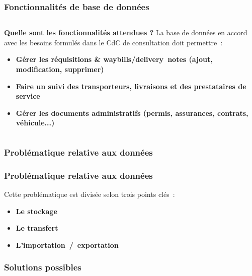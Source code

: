 \begin{frame}
\frametitle{Fonctionnalités de base de données}
\begin{columns}[c]
\begin{column}{12cm}
\begin{block}{\textbf{Quelle sont les fonctionnalités attendues ?}}
La base de données en accord avec les besoins formulés dans le CdC de consultation doit permettre~:
\begin{itemize}
\item<2-> \textbf{Gérer les réquisitions \& waybills/delivery~notes (ajout, modification, supprimer)}
\item<3-> \textbf{Faire un suivi des transporteurs, livraisons et des prestataires de service}
\item<4-> \textbf{Gérer les documents administratifs (permis, assurances, contrats, véhicule...)}
\end{itemize}
\end{block}
\end{column}
\end{columns}
\end{frame}

\subsubsection[Problématique relative aux données]{Problématique relative aux données}

\begin{frame}
\frametitle{Problématique relative aux données}
Cette problématique est divisée selon trois points clés~:
\begin{itemize}
	\item<2-> \textbf{Le stockage}
	\item<3-> \textbf{Le transfert}
	\item<4-> \textbf{L'importation~/~exportation}
\end{itemize}
\end{frame}

\subsubsection[Solutions possibles]{Solutions possibles}

